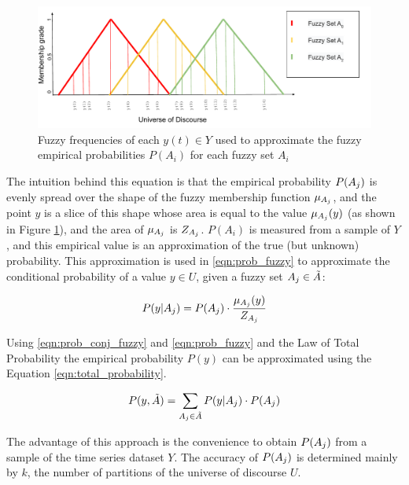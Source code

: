 \begin{figure}
    \centering
    \includegraphics[width=\textwidth]{figures/pwfts_fuzzyfrequency.pdf}
    \caption{Fuzzy frequencies of each $y(t) \in Y$ used to approximate the fuzzy empirical probabilities $P(A_i)$ for each fuzzy set $A_i$}
    \label{fig:pwfts_fuzzyfrequency}
\end{figure}

The intuition behind this equation is that the empirical probability $P(A_j)$ is evenly spread over the shape of the fuzzy membership function $\mu_{A_j}$, and the point $y$ is a slice of this shape whose area is equal to the value $\mu_{A_j}(y)$ (as shown in Figure \ref{fig:pwfts_fuzzyfrequency}), and the area of $\mu_{A_j}$ is $Z_{A_j}$. $P(A_i)$ is measured from a sample of $Y$, and this empirical value is an approximation of the true (but unknown) probability. This approximation is used in \eqref{eqn:prob_fuzzy} to approximate the conditional probability of a value $y \in U$, given a fuzzy set $A_j \in \tilde{A}$:

\begin{equation}
P(y | A_j) = P(A_j) \cdot \frac{\mu_{A_j}(y)}{Z_{A_j}}
\label{eqn:prob_fuzzy}
\end{equation}

Using \eqref{eqn:prob_conj_fuzzy} and \eqref{eqn:prob_fuzzy} and the Law of Total Probability the empirical probability $P(y)$ can be approximated using the Equation \eqref{eqn:total_probability}. 

\begin{equation}
P(y,\tilde{A}) = \sum_{A_j \in \tilde{A}} P(y | A_j)\cdot P(A_j)
\label{eqn:total_probability}
\end{equation}

The advantage of this approach is the convenience to obtain $P(A_j)$ from a sample of the time series dataset $Y$. The accuracy of $P(A_j)$ is determined mainly by $k$, the number of partitions of the universe of discourse $U$.


